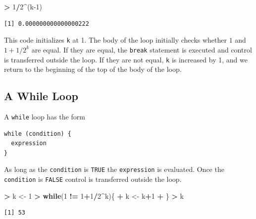 \documentclass[
]{krantz}
\makeatletter
\newenvironment{Shaded}{\begin{snugshade}}{\end{snugshade}}
\newcommand{\ControlFlowTok}[1]{\textcolor[rgb]{0.27,0.27,0.27}{\textbf{#1}}}
\newcommand{\DecValTok}[1]{\textcolor[rgb]{0.06,0.06,0.06}{#1}}
\newcommand{\NormalTok}[1]{#1}
\newcommand{\OperatorTok}[1]{\textcolor[rgb]{0.43,0.43,0.43}{\textbf{#1}}}
\newcommand{\StringTok}[1]{\textcolor[rgb]{0.5,0.5,0.5}{#1}}
\newenvironment{kframe}{%
\medskip{}
\setlength{\fboxsep}{.8em}
 \def\at@end@of@kframe{}%
 \ifinner\ifhmode%
  \def\at@end@of@kframe{\end{minipage}}%
  \begin{minipage}{\columnwidth}%
 \fi\fi%
 \def\FrameCommand##1{\hskip\@totalleftmargin \hskip-\fboxsep
 \colorbox{shadecolor}{##1}\hskip-\fboxsep
     \hskip-\linewidth \hskip-\@totalleftmargin \hskip\columnwidth}%
 \MakeFramed {\advance\hsize-\width
   \@totalleftmargin\z@ \linewidth\hsize
   \@setminipage}}%
 {\par\unskip\endMakeFramed%
 \at@end@of@kframe}
\renewenvironment{Shaded}{\begin{kframe}}{\end{kframe}}
\makeatother
\begin{document}
\begin{Shaded}
\begin{Highlighting}[]
\OperatorTok{\textgreater{}}\StringTok{ }\DecValTok{1}\OperatorTok{/}\DecValTok{2}\OperatorTok{\^{}}\NormalTok{(k}\DecValTok{{-}1}\NormalTok{)}
\end{Highlighting}
\end{Shaded}

\begin{verbatim}
[1] 0.000000000000000222
\end{verbatim}

This code initializes \texttt{k} at 1. The body of the loop initially checks whether \(1\) and \(1+1/2^k\) are equal. If they are equal, the \texttt{break} statement is executed and control is transferred outside the loop. If they are not equal, \texttt{k} is increased by 1, and we return to the beginning of the top of the body of the loop.

\hypertarget{a-while-loop}{%
\subsection{A While Loop}\label{a-while-loop}}

A \texttt{while} loop has the form

\begin{verbatim}
while (condition) {
  expression
}
\end{verbatim}

As long as the \texttt{condition} is \texttt{TRUE} the \texttt{expression} is evaluated. Once the \texttt{condition} is \texttt{FALSE} control is transferred outside the loop.

\begin{Shaded}
\begin{Highlighting}[]
\OperatorTok{\textgreater{}}\StringTok{ }\NormalTok{k \textless{}{-}}\StringTok{ }\DecValTok{1}
\OperatorTok{\textgreater{}}\StringTok{ }\ControlFlowTok{while}\NormalTok{(}\DecValTok{1} \OperatorTok{!=}\StringTok{ }\DecValTok{1}\OperatorTok{+}\DecValTok{1}\OperatorTok{/}\DecValTok{2}\OperatorTok{\^{}}\NormalTok{k)\{}
\OperatorTok{+}\StringTok{     }\NormalTok{k \textless{}{-}}\StringTok{ }\NormalTok{k}\OperatorTok{+}\DecValTok{1} 
\OperatorTok{+}\StringTok{ }\NormalTok{\}}
\OperatorTok{\textgreater{}}\StringTok{ }\NormalTok{k}
\end{Highlighting}
\end{Shaded}

\begin{verbatim}
[1] 53
\end{verbatim}
\end{document}
